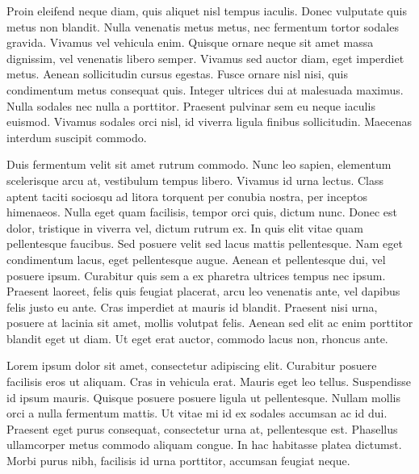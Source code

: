 Proin eleifend neque diam, quis aliquet nisl tempus iaculis. 
Donec vulputate quis metus non blandit. 
Nulla venenatis metus metus, nec fermentum tortor sodales gravida. 
Vivamus vel vehicula enim. 
Quisque ornare neque sit amet massa dignissim, vel venenatis libero semper. 
Vivamus sed auctor diam, eget imperdiet metus. 
Aenean sollicitudin cursus egestas. 
Fusce ornare nisl nisi, quis condimentum metus consequat quis. 
Integer ultrices dui at malesuada maximus. 
Nulla sodales nec nulla a porttitor. 
Praesent pulvinar sem eu neque iaculis euismod. 
Vivamus sodales orci nisl, id viverra ligula finibus sollicitudin. 
Maecenas interdum suscipit commodo.

Duis fermentum velit sit amet rutrum commodo. 
Nunc leo sapien, elementum scelerisque arcu at, vestibulum tempus libero. 
Vivamus id urna lectus. 
Class aptent taciti sociosqu ad litora torquent per conubia nostra, per inceptos himenaeos. 
Nulla eget quam facilisis, tempor orci quis, dictum nunc. 
Donec est dolor, tristique in viverra vel, dictum rutrum ex. 
In quis elit vitae quam pellentesque faucibus. 
Sed posuere velit sed lacus mattis pellentesque. 
Nam eget condimentum lacus, eget pellentesque augue. 
Aenean et pellentesque dui, vel posuere ipsum. 
Curabitur quis sem a ex pharetra ultrices tempus nec ipsum. 
Praesent laoreet, felis quis feugiat placerat, arcu leo venenatis ante, vel dapibus felis justo eu ante. 
Cras imperdiet at mauris id blandit. 
Praesent nisi urna, posuere at lacinia sit amet, mollis volutpat felis. 
Aenean sed elit ac enim porttitor blandit eget ut diam. 
Ut eget erat auctor, commodo lacus non, rhoncus ante.

Lorem ipsum dolor sit amet, consectetur adipiscing elit. 
Curabitur posuere facilisis eros ut aliquam. 
Cras in vehicula erat. 
Mauris eget leo tellus. 
Suspendisse id ipsum mauris. 
Quisque posuere posuere ligula ut pellentesque. 
Nullam mollis orci a nulla fermentum mattis. 
Ut vitae mi id ex sodales accumsan ac id dui. 
Praesent eget purus consequat, consectetur urna at, pellentesque est. 
Phasellus ullamcorper metus commodo aliquam congue. 
In hac habitasse platea dictumst. 
Morbi purus nibh, facilisis id urna porttitor, accumsan feugiat neque.